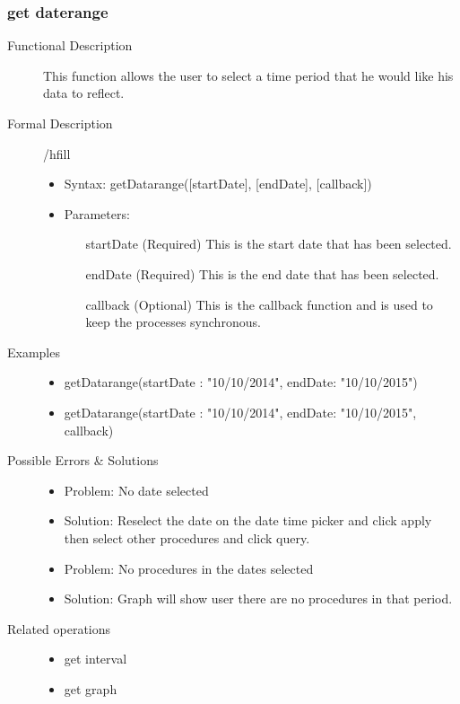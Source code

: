 \documentclass[a4paper]{article}
\begin{document}
\subsubsection{get daterange}
\begin{description}
\item[Functional Description] This function allows the user to select a time period that he would like his data to reflect.
\item[Formal Description]/hfill
\begin{itemize}
	\item Syntax: getDatarange([startDate], [endDate], [callback])\\
	\item Parameters:
		\begin{itemize}
			\item [startDate](Required) This is the start date that has been selected.
			\item [endDate](Required) This is the end date that has been selected.
			\item [callback](Optional) This is the callback function and is used to keep the processes synchronous.
		\end{itemize}
\end{itemize}
\item[Examples]\hfill
\begin{itemize}
	\item getDatarange({startDate : "10/10/2014", endDate: "10/10/2015"})
	\item getDatarange({startDate : "10/10/2014", endDate: "10/10/2015"}, callback)
\end{itemize}
\item[Possible Errors \& Solutions]
\begin{itemize}
	\item Problem: No date selected
	\item Solution: Reselect the date on the date time picker and click apply then select other procedures and click query.
	\item Problem: No procedures in the dates selected
	\item Solution: Graph will show user there are no procedures in that period.
\end{itemize}
\item[Related operations] \hfill
\begin{itemize}
	\item get interval
	\item get graph
\end{itemize}
\end{description}
\end{document}
